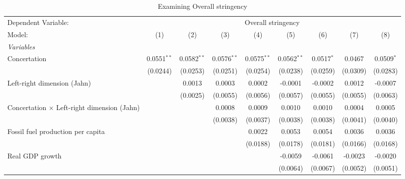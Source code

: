 
\begin{table}[htbp]
   \caption{Examining Overall stringency}
   \centering
   \begin{tabular}{lcccccccc}
      \tabularnewline \midrule \midrule
      Dependent Variable: & \multicolumn{8}{c}{Overall stringency}\\
      Model:                                             & (1)           & (2)           & (3)           & (4)           & (5)           & (6)          & (7)      & (8)\\  
      \midrule
      \emph{Variables}\\
      Concertation                                       & 0.0551$^{**}$ & 0.0582$^{**}$ & 0.0576$^{**}$ & 0.0575$^{**}$ & 0.0562$^{**}$ & 0.0517$^{*}$ & 0.0467   & 0.0509$^{*}$\\   
                                                         & (0.0244)      & (0.0253)      & (0.0251)      & (0.0254)      & (0.0238)      & (0.0259)     & (0.0309) & (0.0283)\\   
      Left-right dimension (Jahn)                        &               & 0.0013        & 0.0003        & 0.0002        & -0.0001       & -0.0002      & 0.0012   & -0.0007\\   
                                                         &               & (0.0025)      & (0.0055)      & (0.0056)      & (0.0057)      & (0.0055)     & (0.0055) & (0.0063)\\   
      Concertation $\times$ Left-right dimension (Jahn)  &               &               & 0.0008        & 0.0009        & 0.0010        & 0.0010       & 0.0004   & 0.0005\\   
                                                         &               &               & (0.0038)      & (0.0037)      & (0.0038)      & (0.0038)     & (0.0041) & (0.0040)\\   
      Fossil fuel production per capita                  &               &               &               & 0.0022        & 0.0053        & 0.0054       & 0.0036   & 0.0036\\   
                                                         &               &               &               & (0.0188)      & (0.0178)      & (0.0181)     & (0.0166) & (0.0168)\\   
      Real GDP growth                                    &               &               &               &               & -0.0059       & -0.0061      & -0.0023  & -0.0020\\   
                                                         &               &               &               &               & (0.0064)      & (0.0067)     & (0.0052) & (0.0051)\\   

\end{tabular}
\end{table}

